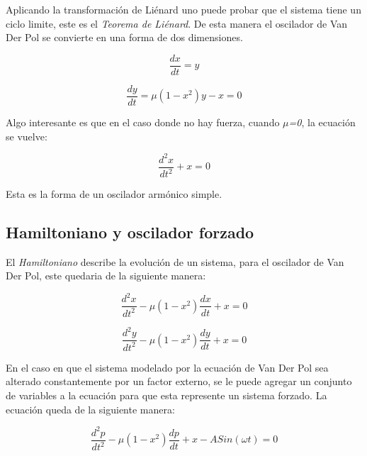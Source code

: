 \documentclass{article}
\begin{document}
\vspace{0.3cm}

Aplicando la transformación de Liénard uno puede probar que el sistema tiene un ciclo limite, este es el \textit{Teorema de Liénard}. De esta manera el oscilador de Van Der Pol se convierte en una forma de dos dimensiones. 

 \begin{equation}
 \frac{dx}{dt} = y
 \end{equation}
 
  \begin{equation}
 \frac{dy}{dt} =\mu (1-x^2)y - x = 0
 \end{equation}
 
 Algo interesante es que en el caso donde no hay fuerza, cuando $\mu$\textit{=0}, la ecuación se vuelve:

 \begin{equation}
 \frac{d^2x}{dt^2} + x = 0
 \end{equation}
 
 Esta es la forma de un oscilador armónico simple.
 
 \subsection{Hamiltoniano y oscilador forzado}
 
 El \textit{Hamiltoniano} describe la evolución de un sistema, para el oscilador de Van Der Pol, este quedaria de la siguiente manera:
 
 \begin{equation}
 \frac{d^2x}{dt^2} -\mu (1-x^2)\frac{dx}{dt} + x = 0
 \end{equation}
 
  \begin{equation}
 \frac{d^2y}{dt^2} -\mu (1-x^2)\frac{dy}{dt} + x = 0
 \end{equation}
 
 \vspace{0.3cm}
 
 En el caso en que el sistema modelado por la ecuación de Van Der Pol sea alterado constantemente por un factor externo, se le puede agregar un conjunto de variables a la ecuación para que esta represente un sistema forzado. La ecuación queda de la siguiente manera:
 
  \begin{equation}
 \frac{d^2p}{dt^2} -\mu (1-x^2)\frac{dp}{dt} + x -ASin(\omega t) = 0
 \end{equation}
 
\end{document}
